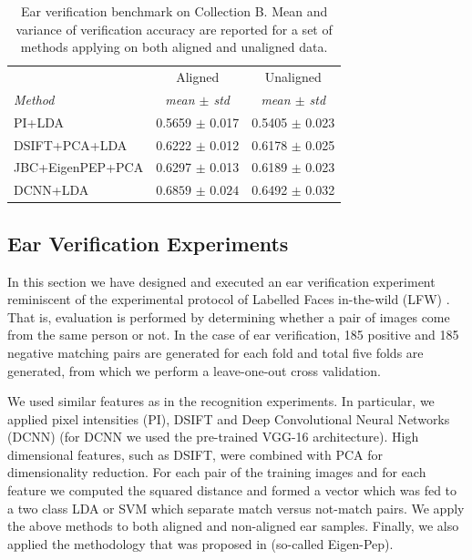 {    \begin{table}[h!]
    \centering
    \scriptsize
    \begin{tabular}{|l|c|c|}
    \hline
    
                            &   Aligned             &   Unaligned  \\
    \emph{Method}    & \emph{mean $\pm$ std} & \emph{mean $\pm$ std} \\
    \hline\hline
    PI+LDA           & 0.5659 $\pm$ 0.017    & 0.5405 $\pm$ 0.023 \\
    DSIFT+PCA+LDA    & 0.6222 $\pm$ 0.012    & 0.6178 $\pm$ 0.025 \\
    JBC+EigenPEP+PCA & 0.6297 $\pm$ 0.013    & 0.6189 $\pm$ 0.023 \\
    DCNN+LDA         & $\bm{0.6859}$ $\pm$ $\bm{0.024}$    & 0.6492 $\pm$ 0.032 \\
    \hline
    \end{tabular}
    \caption{Ear verification benchmark on Collection B. Mean and variance of verification accuracy are reported for a set of methods applying on both aligned and unaligned data.}
    \label{tab:ear_verification_benchmark}
    \end{table}
}


\subsection{Ear Verification Experiments}

In this section we have designed and executed an ear verification experiment reminiscent of the experimental protocol of Labelled Faces in-the-wild (LFW) \cite{huang2007labeled}.  That is, evaluation is performed by determining whether a pair of images come from the same person or not. In the case of ear verification, 185 positive and 185 negative matching pairs are generated for each fold and total five folds are generated, from which we perform a leave-one-out cross validation.

We used similar features as in the recognition experiments. In particular, we applied pixel intensities (PI), DSIFT and Deep Convolutional Neural Networks (DCNN) \cite{simonyan2014very} (for DCNN we used the pre-trained VGG-16 architecture). High dimensional features, such as DSIFT, were combined with PCA for dimensionality reduction. For each pair of the training images and for each feature we computed the squared distance and formed a vector which was fed to a two class LDA or SVM which separate match versus not-match pairs. We apply the above methods to both aligned and non-aligned ear samples. Finally, we also applied the methodology that was proposed in \cite{li2014eigen} (so-called Eigen-Pep).


